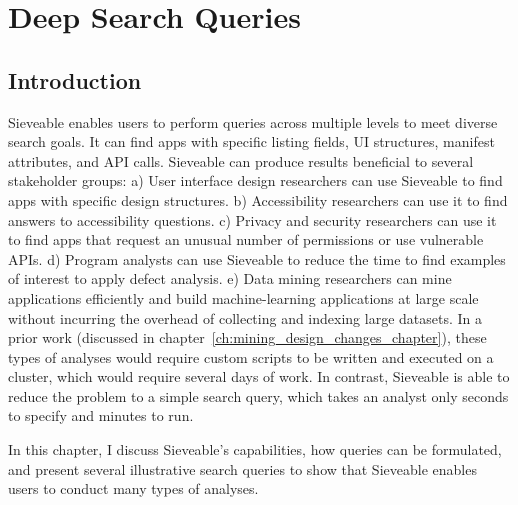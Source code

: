 \chapter{Deep Search Queries}
\label{ch:queries_chapter}

\section{Introduction}
Sieveable enables users to perform queries across multiple levels to meet diverse search goals.
It can find apps with specific listing fields, UI structures, manifest attributes, and API calls.
Sieveable can produce results beneficial to several stakeholder groups:
a) User interface design researchers can use Sieveable to find apps with specific design structures.
b) Accessibility researchers can use it to find answers to accessibility questions.
c) Privacy and security researchers can use it to find apps that request an unusual number of permissions or use vulnerable APIs.
d) Program analysts can use Sieveable to reduce the time to find examples of interest to apply defect analysis.
e) Data mining researchers can mine applications efficiently and build machine-learning applications at large scale without incurring the overhead of collecting and indexing large datasets.
In a prior work (discussed in chapter~\ref{ch:mining_design_changes_chapter}), these types of analyses would require custom scripts to be written and executed on a cluster, which would require several days of work.
In contrast, Sieveable is able to reduce the problem to a simple search query, which takes an analyst only seconds to specify and minutes to run.

In this chapter, I discuss Sieveable's capabilities, how queries can be formulated, and present several illustrative search queries to show that Sieveable enables users to conduct many types of analyses.
